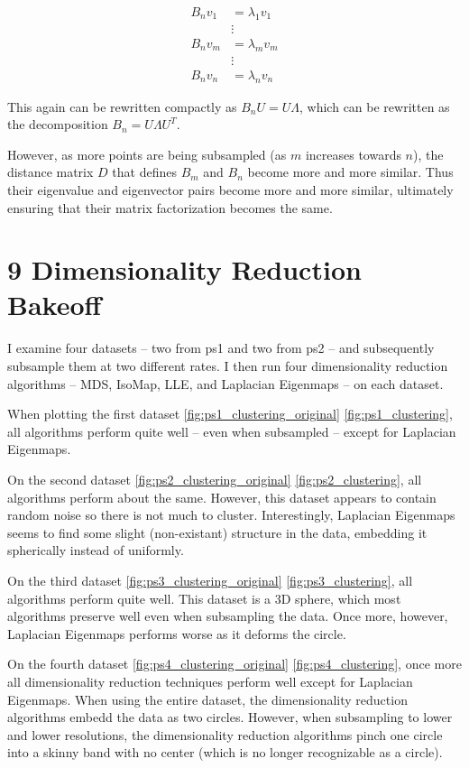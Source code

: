 \documentclass{article}
\begin{document}
        \begin{align*}
            B_n v_1 &= \lambda_1 v_1 \\
            & \vdots \\
            B_n v_m &= \lambda_m v_m \\
            & \vdots \\
            B_n v_n &= \lambda_n v_n
        \end{align*}

        This again can be rewritten compactly as $B_n U = U \Lambda$, which can be rewritten as the decomposition $B_n = U \Lambda U^T$.

        However, as more points are being subsampled (as $m$ increases towards $n$), the distance matrix $D$ that defines $B_m$ and $B_n$ become more and more similar. Thus their eigenvalue and eigenvector pairs become more and more similar, ultimately ensuring that their matrix factorization becomes the same.


\section*{9 Dimensionality Reduction Bakeoff}

        I examine four datasets -- two from ps1 and two from ps2 -- and subsequently subsample them at two different rates. I then run four dimensionality reduction algorithms -- MDS, IsoMap, LLE, and Laplacian Eigenmaps -- on each dataset.

        When plotting the first dataset \ref{fig:ps1_clustering_original} \ref{fig:ps1_clustering}, all algorithms perform quite well -- even when subsampled -- except for Laplacian Eigenmaps.
        
        On the second dataset \ref{fig:ps2_clustering_original} \ref{fig:ps2_clustering}, all algorithms perform about the same. However, this dataset appears to contain random noise so there is not much to cluster. Interestingly, Laplacian Eigenmaps seems to find some slight (non-existant) structure in the data, embedding it spherically instead of uniformly.

        On the third dataset \ref{fig:ps3_clustering_original} \ref{fig:ps3_clustering}, all algorithms perform quite well. This dataset is a 3D sphere, which most algorithms preserve well even when subsampling the data. Once more, however, Laplacian Eigenmaps performs worse as it deforms the circle.

        On the fourth dataset \ref{fig:ps4_clustering_original} \ref{fig:ps4_clustering}, once more all dimensionality reduction techniques perform well except for Laplacian Eigenmaps. When using the entire dataset, the dimensionality reduction algorithms embedd the data as two circles. However, when subsampling to lower and lower resolutions, the dimensionality reduction algorithms pinch one circle into a skinny band with no center (which is no longer recognizable as a circle).
\end{document}
